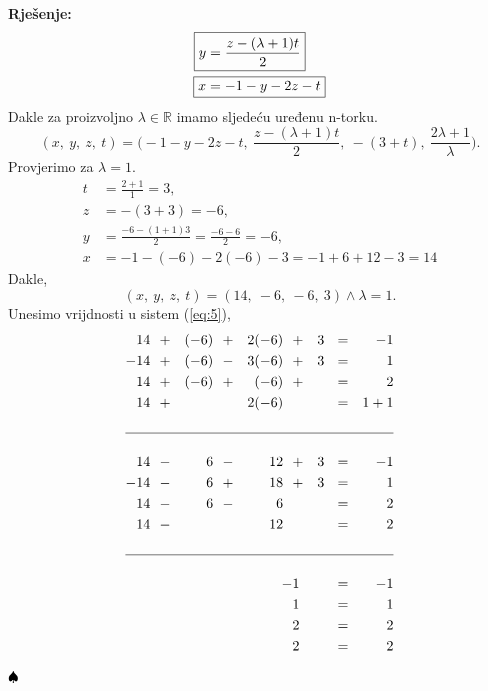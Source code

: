 \documentclass{article}
\newenvironment{solution}{\noindent\textbf{Rje\v senje:\newline}}{$\hfill\spadesuit$}
\begin{document}
\begin{solution}
\begin{equation*}
\begin{aligned}
                    \Aboxed{y&=\frac{z-(\lambda +1)t}{2}} \\
                    \Aboxed{x&=-1-y-2z-t} \\
        \end{aligned}
    \end{equation*}
    Dakle za proizvoljno $\lambda\in\mathbb{R}$ imamo sljede\' cu uređenu n-torku.
    $$(x,\ y,\ z,\ t)=\biggl(-1-y-2z-t,\ \frac{z-(\lambda +1)t}{2},\ -(3+t),\ \frac{2\lambda +1}{\lambda}\biggr).$$
    Provjerimo za $\lambda =1$. \\
    \begin{equation*}
        \begin{aligned}
            \boxed{t}&=\frac{2+1}{1}=\boxed{3}, \\
            \boxed{z}&=-(3+3)=\boxed{-6}, \\
            \boxed{y}&=\frac{-6-(1+1)3}{2}=\frac{-6-6}{2}=\boxed{-6}, \\
            \boxed{x}&=-1-(-6)-2(-6)-3=-1+6+12-3=\boxed{14}
        \end{aligned}
    \end{equation*}
    Dakle,
    $$(x,\ y,\ z,\ t)=(14,\ -6,\ -6,\ 3)\land\lambda =1.$$
    Unesimo vrijdnosti u sistem (\ref{eq:5}),
    \begin{equation*}
        \begin{aligned}
            14\ \ &+&(-6)\ \ &+&2(-6)\ \ &+&3&\ \ =&-1 \\
            -14\ \ &+&(-6)\ \ &-&3(-6)\ \ &+&3&\ \ =&1 \\
             14\ \ &+&(-6)\ \ &+& (-6)\ \ &+& &\ \ =&2 \\
             14\ \ &+& \ \ & &2(-6)\ \ & & &\ \ =&1+1 \\\\
             \hline\\
             14\ \ &-&6\ \ &-&12\ \ &+&3&\ \ =&-1 \\
            -14\ \ &-&6\ \ &+&18\ \ &+&3&\ \ =&1 \\
             14\ \ &-&6\ \ &-&6\ \ && &\ \ =&2 \\
             14\ \ &-& \ \ & &12\ \ & & &\ \ =&2 \\\\
             \hline\\
             \ \ & & \ \ & & \ \ -&1& &\ \ =&-1 \\
             \ \ & & \ \ & & \ \ &1& &\ \ =&1 \\
             \ \ & & \ \ & & \ \ &2& &\ \ =&2 \\
             \ \ & & \ \ & & \ \ &2& &\ \ =&2 \\
            \end{aligned}
        \end{equation*}
        
\end{solution}
\end{document}
